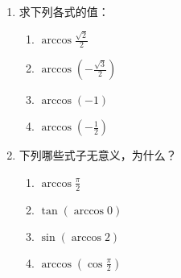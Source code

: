 \begin{enumerate}
    \item 求下列各式的值：
\begin{multicols}{2}
\begin{enumerate}[(1)]
    \item $\arccos \frac{\sqrt{2}}{2}$
    \item $\arccos \left(-\frac{\sqrt{3}}{2}\right)$
    \item $\arccos (-1)$
    \item $\arccos \left(-\frac{1}{2}\right)$
\end{enumerate}
\end{multicols}
    \item 下列哪些式子无意义，为什么？
\begin{multicols}{2}
\begin{enumerate}[(1)]
    \item $\arccos \frac{\pi}{2}$
    \item $\tan(\arccos 0)$
    \item $\sin(\arccos 2)$
    \item $\arccos\left(\cos\frac{\pi}{2}\right) $
    

\end{enumerate}
\end{multicols}
\end{enumerate}

